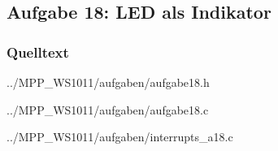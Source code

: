 \subsection*{Aufgabe 18: LED als Indikator}

\subsubsection*{Quelltext}

{../MPP_WS1011/aufgaben/aufgabe18.h}


{../MPP_WS1011/aufgaben/aufgabe18.c}


{../MPP_WS1011/aufgaben/interrupts_a18.c}

